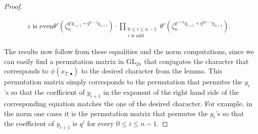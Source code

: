 \documentclass[12pt, reqno]{amsart}
\theoremstyle{definition}
\theoremstyle{definition}
\theoremstyle{definition}
\newcommand{\GL}{\mathrm{GL}}
\newcommand{\FieldNorm}[2]{\mathrm{N}_{#1:#2}}
\newcommand{\aFieldNorm}{\mathrm{N}}
\newcommand{\finiteField}{\mathbb{F}}
\newcommand{\finiteFieldExtension}[1]{\finiteField_{#1}}
\newcommand{\NormOneGroup}[1]{\finiteFieldExtension{#1}^{\aFieldNorm = 1}}
\newcommand{\algebraicGroup}[1]{\boldsymbol{\mathrm{#1}}}
\begin{document}
\begin{proof}
\begin{enumerate}
\begin{align*}
{{			i \text{ is even}}} \theta'\left(\zeta_n^{q^{i} y_{i+1} + q^{n-i} y_{n+i}}\right) \cdot \prod_{\substack{0 \le i \le n-1\\
		i \text{ is odd}}} \theta'\left(\zeta_n^{q^{i+n} y_{i+1} + q^{2n-i} y_{n+i}}\right).
	\end{align*}
\end{enumerate}
The results now follow from these equalities and the norm computations, since we can easily find a permutation matrix in $\GL_{2n}$ that conjugates the character that corresponds to $\phi\left(x_{T,\bullet}\right)$ to the desired character from the lemma. This permutation matrix simply corresponds to the permutation that permutes the $y_i$'s so that the coefficient of $y_{i+1}$ in the exponent of the right hand side of the corresponding equation matches the one of the desired character. For example, in the norm one cases it is the permutation matrix that permutes the $y_i$'s so that the coefficient of $y_{i+1}$ is $q^{i}$ for every $0 \le i \le n-1$.
\begin{comment}
Thus the result follows from the computations:
\begin{enumerate}
	\item[B,C,D Case 1] \begin{align*}
		\exp(\langle\phi(x_{\finiteFieldExtension{n},\alpha}),(y_1,y_2)\rangle) &= \exp(\langle x_{\finiteFieldExtension{n},\alpha},\phi^*(y_1,y_2)\rangle) \\
		&= \alpha\left(\FieldNorm{mn}{n}(y_1(\zeta_{mn})\right) \alpha\left(\FieldNorm{mn}{n}(y_2(\zeta_{mn})\right)^{-1} \\
		&= \left(\alpha\times\alpha^{-1}\right)\left(\FieldNorm{mn}{n}((y_1,y_2)(\zeta_{mn}))\right)
	\end{align*}
	\item \begin{align*}
		\exp(\langle\phi(x_{\NormOneGroup{2n},\theta}),(y_1,y_2)\rangle) &= \exp(\langle x_{\NormOneGroup{2n},\theta},\phi^*(y_1,y_2)\rangle) \\
		&= \theta\left(\frac{\FieldNorm{2mn}{2n}(y_1(\zeta_{2mn})}{\FieldNorm{2mn}{2n}\left(y_1(\zeta_{2mn})^{q^n}\right)}\right) \theta\left(\frac{\FieldNorm{2mn}{2n}(y_2(\zeta_{2mn})}{\FieldNorm{2mn}{2n}\left(y_2(\zeta_{2mn})^{q^n}\right)}\right)^{-1} \\
		&= \theta'\left(\FieldNorm{2mn}{2n}((y_1,y_2)(\zeta_{mn}))\right)
	\end{align*}
\end{enumerate}
\end{comment}
\end{proof}
\end{document}
